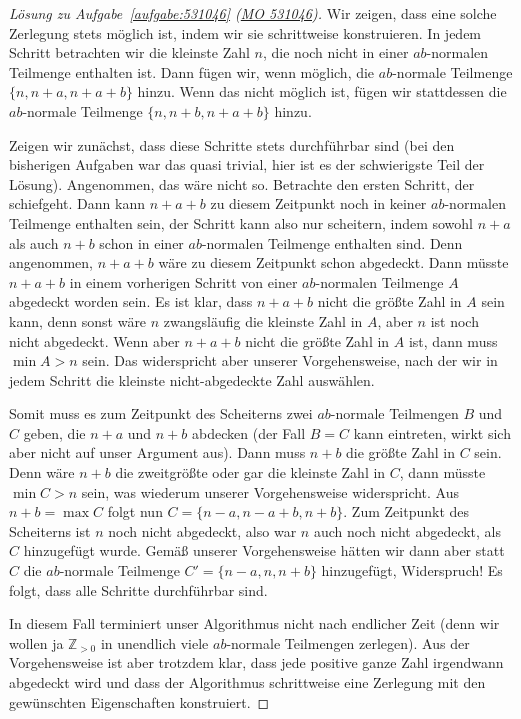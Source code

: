 \begin{proof}[Lösung zu Aufgabe~\ref{aufgabe:531046} \textmd{(\href{https://www.mathematik-olympiaden.de/moev/index.php?option=com_download&thema=a&format=raw&datei=A53104b.pdf}{MO 531046})}]
	Wir zeigen, dass eine solche Zerlegung stets möglich ist, indem wir sie schrittweise konstruieren. In jedem Schritt betrachten wir die kleinste Zahl $n$, die noch nicht in einer $ab$-normalen Teilmenge enthalten ist. Dann fügen wir, wenn möglich, die $ab$-normale Teilmenge $\{n,n+a,n+a+b\}$ hinzu. Wenn das nicht möglich ist, fügen wir stattdessen die $ab$-normale Teilmenge $\{n,n+b,n+a+b\}$ hinzu.
	
	Zeigen wir zunächst, dass diese Schritte stets durchführbar sind (bei den bisherigen Aufgaben war das quasi trivial, hier ist es der schwierigste Teil der Lösung). Angenommen, das wäre nicht so. Betrachte den ersten Schritt, der schiefgeht. Dann kann $n+a+b$ zu diesem Zeitpunkt noch in keiner $ab$-normalen Teilmenge enthalten sein, der Schritt kann also nur scheitern, indem sowohl $n+a$ als auch $n+b$ schon in einer $ab$-normalen Teilmenge enthalten sind. Denn angenommen, $n+a+b$ wäre zu diesem Zeitpunkt schon abgedeckt. Dann müsste $n+a+b$ in einem vorherigen Schritt von einer $ab$-normalen Teilmenge $A$ abgedeckt worden sein. Es ist klar, dass $n+a+b$ nicht die größte Zahl in $A$ sein kann, denn sonst wäre $n$ zwangsläufig die kleinste Zahl in $A$, aber $n$ ist noch nicht abgedeckt. Wenn aber $n+a+b$ nicht die größte Zahl in $A$ ist, dann muss $\min A> n$ sein. Das widerspricht aber unserer Vorgehensweise, nach der wir in jedem Schritt die kleinste nicht-abgedeckte Zahl auswählen.
	
	Somit muss es zum Zeitpunkt des Scheiterns zwei $ab$-normale Teilmengen $B$ und $C$ geben, die $n+a$ und $n+b$ abdecken (der Fall $B=C$ kann eintreten, wirkt sich aber nicht auf unser Argument aus). Dann muss $n+b$ die größte Zahl in $C$ sein. Denn wäre $n+b$ die zweitgrößte oder gar die kleinste Zahl in $C$, dann müsste $\min C>n$ sein, was wiederum unserer Vorgehensweise widerspricht. Aus $n+b=\max C$ folgt nun $C=\{n-a,n-a+b,n+b\}$. Zum Zeitpunkt des Scheiterns ist $n$ noch nicht abgedeckt, also war $n$ auch noch nicht abgedeckt, als $C$ hinzugefügt wurde. Gemäß unserer Vorgehensweise hätten wir dann aber statt $C$ die $ab$-normale Teilmenge $C'=\{n-a,n,n+b\}$ hinzugefügt, Widerspruch! Es folgt, dass alle Schritte durchführbar sind.
	
	In diesem Fall terminiert unser Algorithmus nicht nach endlicher Zeit (denn wir wollen ja $\mathbb Z_{>0}$ in unendlich viele $ab$-normale Teilmengen zerlegen). Aus der Vorgehensweise ist aber trotzdem klar, dass jede positive ganze Zahl irgendwann abgedeckt wird und dass der Algorithmus schrittweise eine Zerlegung mit den gewünschten Eigenschaften konstruiert.
\end{proof}
